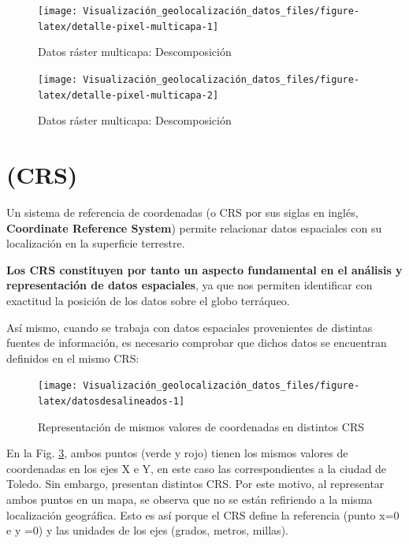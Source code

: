 \documentclass[
]{book}
\theoremstyle{definition}
\theoremstyle{definition}
\theoremstyle{definition}
\theoremstyle{definition}
\theoremstyle{remark}
\begin{document}
\begin{figure}

{\centering \texttt{[image: Visualización\_geolocalización\_datos\_files/figure-latex/detalle-pixel-multicapa-1]} 

}

\caption{Datos ráster multicapa: Descomposición}\label{fig:detalle-pixel-multicapa-1}
\end{figure}
\begin{figure}

{\centering \texttt{[image: Visualización\_geolocalización\_datos\_files/figure-latex/detalle-pixel-multicapa-2]} 

}

\caption{Datos ráster multicapa: Descomposición}\label{fig:detalle-pixel-multicapa-2}
\end{figure}

\hypertarget{CRS}{%
\section{\texorpdfstring{ (CRS)}{ (CRS)}}\label{CRS}}

Un sistema de referencia de coordenadas (o CRS por sus siglas en inglés,
\textbf{Coordinate Reference System}) permite relacionar datos espaciales con su
localización en la superficie terrestre.

\textbf{Los CRS constituyen por tanto un aspecto fundamental en el análisis y
representación de datos espaciales}, ya que nos permiten identificar con
exactitud la posición de los datos sobre el globo terráqueo.

Así mismo, cuando se trabaja con datos espaciales provenientes de distintas
fuentes de información, es necesario comprobar que dichos datos se encuentran
definidos en el mismo CRS:

\begin{figure}

{\centering \texttt{[image: Visualización\_geolocalización\_datos\_files/figure-latex/datosdesalineados-1]} 

}

\caption{Representación de mismos valores de coordenadas en distintos CRS}\label{fig:datosdesalineados}
\end{figure}

En la Fig. \ref{fig:datosdesalineados}, ambos puntos (verde y rojo) tienen los
mismos valores de coordenadas en los ejes X e Y, en este caso las
correspondientes a la ciudad de Toledo. Sin embargo, presentan distintos CRS.
Por este motivo, al representar ambos puntos en un mapa, se observa que no se
están refiriendo a la misma localización geográfica. Esto es así porque el CRS
define la referencia (punto x=0 e y =0) y las unidades de los ejes (grados,
metros, millas).
\end{document}
